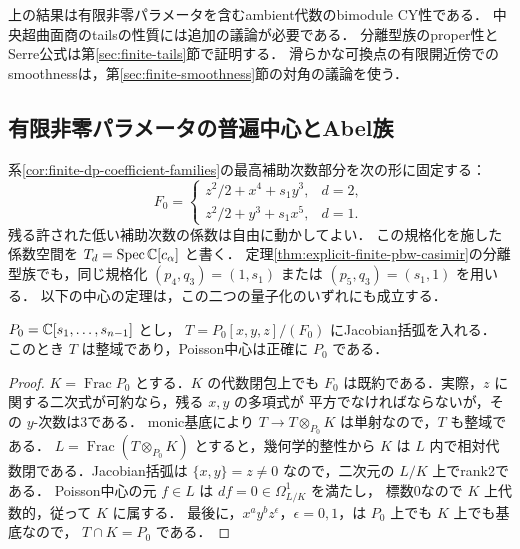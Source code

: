 \begin{remark}
上の結果は有限非零パラメータを含むambient代数のbimodule CY性である．
中央超曲面商のtailsの性質には追加の議論が必要である．
分離型族のproper性とSerre公式は第\ref{sec:finite-tails}節で証明する．
滑らかな可換点の有限開近傍でのsmoothnessは，第\ref{sec:finite-smoothness}節の対角の議論を使う．
\end{remark}

\subsection{有限非零パラメータの普遍中心とAbel族}
\label{subsec:finite-universal-center}

系\ref{cor:finite-dp-coefficient-families}の最高補助次数部分を次の形に固定する：
\[
 F_0=\begin{cases}
 z^2/2+x^4+s_1y^3,&d=2,\\
 z^2/2+y^3+s_1x^5,&d=1.
 \end{cases}
\]
残る許された低い補助次数の係数は自由に動かしてよい．
この規格化を施した係数空間を $T_d=\operatorname{Spec}\mathbb C[c_\alpha]$ と書く．
定理\ref{thm:explicit-finite-pbw-casimir}の分離型族でも，同じ規格化
$(p_4,q_3)=(1,s_1)$ または $(p_5,q_3)=(s_1,1)$ を用いる．
以下の中心の定理は，この二つの量子化のいずれにも成立する．

\begin{lemma}[最高記号のPoisson中心]
\label{lem:finite-symbol-poisson-center}
$P_0=\mathbb C[s_1,\ldots,s_{n-1}]$ とし，
$T=P_0[x,y,z]/(F_0)$ にJacobian括弧を入れる．
このとき $T$ は整域であり，Poisson中心は正確に $P_0$ である．
\end{lemma}
\begin{proof}
$K=\operatorname{Frac}P_0$ とする．$K$ の代数閉包上でも
$F_0$ は既約である．実際，$z$ に関する二次式が可約なら，残る $x,y$ の多項式が
平方でなければならないが，その $y$-次数は3である．
monic基底により $T\to T\otimes_{P_0}K$ は単射なので，$T$ も整域である．
$L=\operatorname{Frac}(T\otimes_{P_0}K)$ とすると，幾何学的整性から
$K$ は $L$ 内で相対代数閉である．Jacobian括弧は
$\{x,y\}=z\ne0$ なので，二次元の $L/K$ 上でrank2である．
Poisson中心の元 $f\in L$ は $df=0\in\Omega^1_{L/K}$ を満たし，
標数0なので $K$ 上代数的，従って $K$ に属する．
最後に，$x^ay^bz^\epsilon$，$\epsilon=0,1$，は $P_0$ 上でも $K$ 上でも基底なので，
$T\cap K=P_0$ である．
\end{proof}

